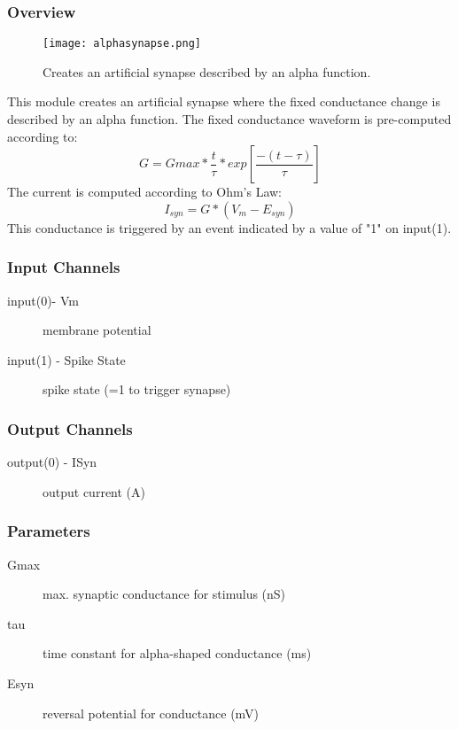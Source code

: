 \subsubsection{Overview}
\label{Alpha Synapse}
\begin{figure}[h]
\begin{center}
\texttt{[image: alphasynapse.png]} 
\caption[Alpha Synapse]{Creates an artificial synapse described by an alpha function.} 
\end{center}
\label{alphasynapse}
\end{figure}

This module creates an artificial synapse where the fixed conductance change is described by an alpha function. The fixed conductance waveform is pre-computed according to: \begin{equation}G = Gmax*\frac{t}{\tau}*exp[\frac{-(t-\tau)}{\tau}]\end{equation}
The current is computed according to Ohm's Law: \begin{equation}I_{syn} = G*(V_m-E_{syn})\end{equation}
This conductance is triggered by an event indicated by a value of "1" on input(1).

\subsubsection{Input Channels}
\begin{description}
\item[input(0)- Vm] membrane potential
\item[input(1) - Spike State] spike state (=1 to trigger synapse)
\end{description}

\subsubsection{Output Channels}
\begin{description}
\item[output(0) - ISyn] output current (A)
\end{description}

\subsubsection{Parameters}
\begin{description}
\item[Gmax] max. synaptic conductance for stimulus (nS)
\item[tau] time constant for alpha-shaped conductance (ms)
\item[Esyn] reversal potential for conductance (mV)
\end{description}